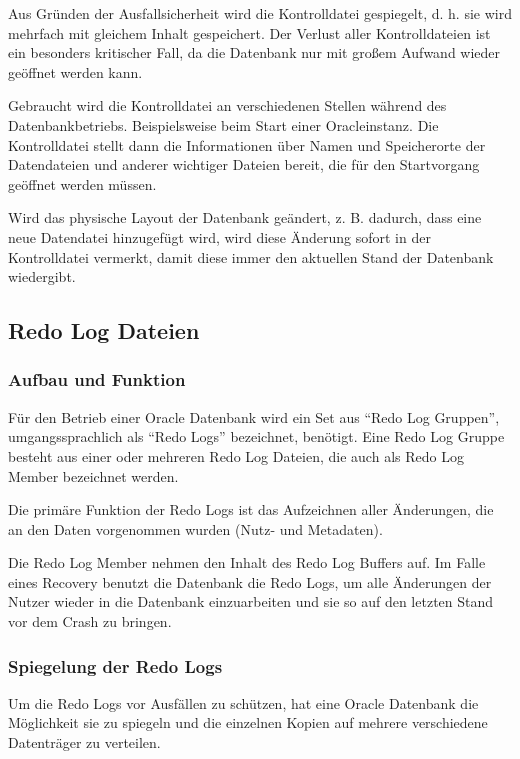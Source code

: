 
          Aus Gr\"unden der Ausfallsicherheit wird die Kontrolldatei gespiegelt, d. h. sie wird mehrfach mit gleichem Inhalt gespeichert. Der Verlust aller Kontrolldateien ist ein besonders kritischer Fall, da die Datenbank nur mit gro\ss{}em Aufwand wieder ge\"offnet werden kann.

          Gebraucht wird die Kontrolldatei an verschiedenen Stellen w\"ahrend des Datenbankbetriebs. Beispielsweise beim Start einer Oracleinstanz. Die Kontrolldatei stellt dann die Informationen \"uber Namen und Speicherorte der Datendateien und anderer wichtiger Dateien bereit, die f\"ur den Startvorgang ge\"offnet werden m\"ussen.

          Wird das physische Layout der Datenbank ge\"andert, z. B. dadurch, dass eine neue Datendatei hinzugef\"ugt wird, wird diese \"Anderung sofort in der Kontrolldatei vermerkt, damit diese immer den aktuellen Stand der Datenbank wiedergibt.
        \subsection{Redo Log Dateien}
          \subsubsection{Aufbau und Funktion}
            F\"ur den Betrieb einer Oracle Datenbank wird ein Set aus \enquote{Redo Log Gruppen}, umgangssprachlich als \enquote{Redo Logs} bezeichnet, ben\"otigt. Eine Redo Log Gruppe besteht aus einer oder mehreren Redo Log Dateien, die auch als Redo Log Member bezeichnet werden.

            Die prim\"are Funktion der Redo Logs ist das Aufzeichnen aller \"Anderungen, die an den Daten vorgenommen wurden (Nutz- und Metadaten).


            Die Redo Log Member nehmen den Inhalt des Redo Log Buffers auf. Im Falle eines Recovery benutzt die Datenbank die Redo Logs, um alle \"Anderungen der Nutzer wieder in die Datenbank einzuarbeiten und sie so auf den letzten Stand vor dem Crash zu bringen.


          \subsubsection{Spiegelung der Redo Logs}
            Um die Redo Logs vor Ausf\"allen zu sch\"utzen, hat eine Oracle Datenbank die M\"og\-lich\-keit sie zu spiegeln und die einzelnen Kopien auf mehrere verschiedene Datentr\"ager zu verteilen.


